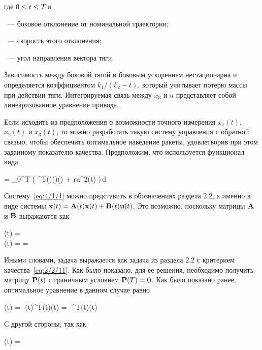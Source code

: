 где $0 \leqslant t \leqslant T$ и

\bdescr
	\item[$x_1$]~--- боковое отклонение от номинальной траектории;
	\item[$x_2$]~--- скорость этого отклонения;
	\item[$x_3$]~--- угол направления вектора тяги.
\edescr

Зависимость между боковой тягой и боковым ускорением нестационарна и определяется коэффициентом $k_1 / (k_2 - t)$, который учитывает потерю массы при действии тяги. Интегрируемая связь между $x_3$ и $u$ представляет собой линеаризованное уравнение привода.

Если исходить из предположения о возможности точного измерения $x_1(t)$, $x_2(t)$ и $x_3(t)$, то можно разработать такую систему управления с обратной связью, чтобы обеспечить оптимальное наведение ракеты, удовлетворив при этом заданному показателю качества. Предположим, что используется функционал вида

	\funcF =  \int\limits_0^T \bigl( ^T(\tau)(\tau)(\tau) + ru^2(t) \bigr)\,d\tau {}
\eeq

Систему~\ref{eq:4/1/1} можно представить в обозначениях раздела 2.2, а именно в виде системы $\mathbf{x}(t) = \mathbf{A}(t)\mathbf{x}(t) + \mathbf{B}(t)\mathbf{u}(t)$. Это возможно, поскольку матрицы $\mathbf{A}$ и $\mathbf{B}$ выражаются как

\beqarr
		(t) =  \text{;} \\
		(t) =  =  
\eeqarr

Иными словами, задача выражается как задача из раздела 2.2 с критерием качества~\vref{eq:2/2/11}. Как было показано, для ее решения, необходимо получить матрицу $\mathbf{P}(t)$ с граничным условием $\mathbf{P}(T) = \mathbf{0}$. Как было показано ранее, оптимальное уравнение в данном случае равно

	\optU(t) = -(t)^T(t)(t) = -^T(t)(t) 
\eeq

С другой стороны, так как

	(t) =  \text{,}
\eeq

